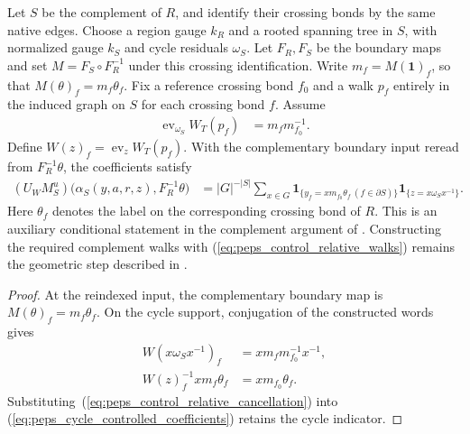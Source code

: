 \begin{lemma}%
    \label{thm:peps_cycle_controlled_relative_walks}
    \leanok
    Let $S$ be the complement of $R$, and identify their crossing bonds
    by the same native edges. Choose a region gauge $k_R$ and a rooted
    spanning tree in $S$, with normalized gauge $k_S$ and cycle residuals
    $\omega_S$. Let $F_R,F_S$ be the boundary maps and set
    $M=F_S\circ F_R^{-1}$ under this crossing identification. Write
    $m_f=M(\mathbf 1)_f$, so that $M(\theta)_f=m_f\theta_f$.
    Fix a reference crossing bond $f_0$ and a walk $p_f$ entirely
    in the induced graph on $S$ for each crossing bond $f$. Assume
    \begin{align}
        \operatorname{ev}_{\omega_S}W_T(p_f) & =m_fm_{f_0}^{-1}.
        \label{eq:peps_control_relative_walks}
    \end{align}
    Define $W(z)_f=\operatorname{ev}_zW_T(p_f)$. With the complementary
    boundary input reread from $F_R^{-1}\theta$, the coefficients
    satisfy
    \begin{align}
        (U_WM_S^u)\bigl(\alpha_S(y,a,r,z),F_R^{-1}\theta\bigr)
         & =|G|^{-|S|}\sum_{x\in G}
        \mathbf 1_{\{y_f=xm_{f_0}\theta_f\ (f\in\partial S)\}}
        \mathbf 1_{\{z=x\omega_S x^{-1}\}}.
        \label{eq:peps_control_common_transport}
    \end{align}
    Here $\theta_f$ denotes the label on the corresponding crossing bond
    of $R$. This is an auxiliary conditional statement in the complement
    argument of \cite[\S6.3]{Schuch2010PEPS}. Constructing the required
    complement walks with (\ref{eq:peps_control_relative_walks}) remains
    the geometric step described in
    \cite{gap:rmp_peps_quantum_double_g_isometry}.
\end{lemma}
\begin{proof}\leanok
    At the reindexed input, the complementary boundary map
    is $M(\theta)_f=m_f\theta_f$. On the cycle support, conjugation
    of the constructed words gives
    \begin{align}
        W(x\omega_S x^{-1})_f   & =xm_fm_{f_0}^{-1}x^{-1}, \\
        W(z)_f^{-1}xm_f\theta_f & =xm_{f_0}\theta_f.
        \label{eq:peps_control_relative_cancellation}
    \end{align}
    Substituting~(\ref{eq:peps_control_relative_cancellation}) into
    (\ref{eq:peps_cycle_controlled_coefficients}) retains the cycle indicator.
\end{proof}


